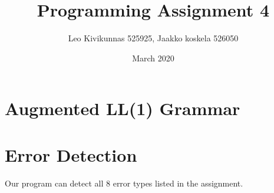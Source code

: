 \documentclass{article}
\title{Programming Assignment 4}
\author{Leo Kivikunnas 525925, Jaakko koskela 526050}
\date{March 2020}
\begin{document}
\maketitle

\section{Augmented LL(1) Grammar}


\section{Error Detection}

Our program can detect all 8 error types listed in the assignment.
\end{document}
